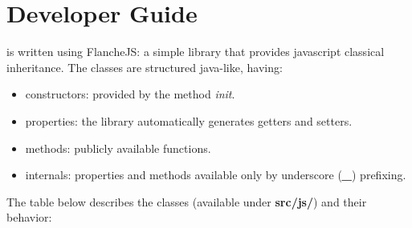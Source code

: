 \section{Developer Guide}
\KAT is written using FlancheJS: a simple library that provides javascript classical
inheritance. The classes are structured java-like, having:
\begin{itemize}
 \item constructors: provided by the method \textit{\textit{init}}.
 \item properties: the library automatically generates getters and setters.
 \item methods: publicly available functions.
 \item internals: properties and methods available only by underscore (\textbf{\textit{\_}}) prefixing.
\end{itemize}

The table below describes the \KAT classes (available under \textbf{src/js/}) and their behavior:

